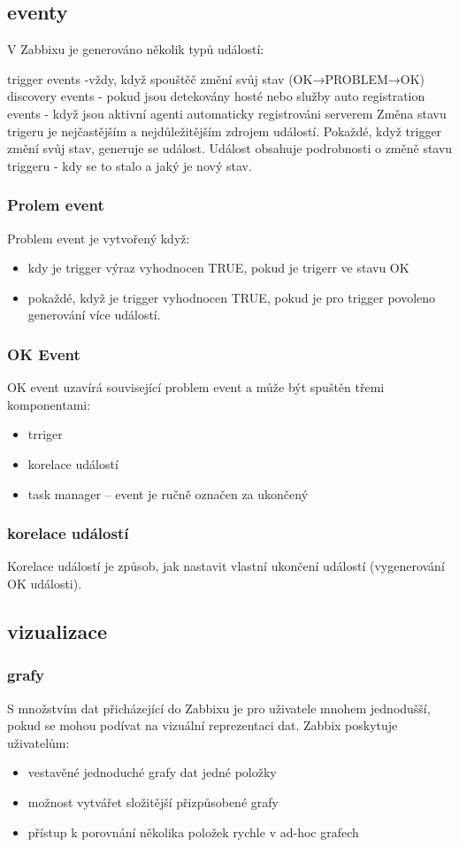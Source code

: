 \documentclass{article}
\begin{document}
 \subsection{eventy}
V Zabbixu je generováno několik typů událostí:

trigger events -vždy, když spouštěč změní svůj stav  (OK→PROBLEM→OK)
\newline discovery events -  pokud jsou detekovány hosté nebo služby
auto registration events -  když jsou aktivní agenti automaticky registrováni serverem
\newline
Změna stavu trigeru je nejčastějším a nejdůležitějším zdrojem událostí. Pokaždé, když trigger změní svůj stav, generuje se událost. Událost obsahuje podrobnosti o změně stavu triggeru - kdy se to stalo a jaký je nový stav. 
\subsubsection{Prolem event}
    Problem event je vytvořený když:
    \begin{itemize}
        \item kdy je trigger výraz vyhodnocen TRUE, pokud je trigerr ve stavu OK
        \item pokaždé, když je trigger vyhodnocen TRUE, pokud je pro trigger povoleno generování více událostí.
    \end{itemize}
\subsubsection{OK Event}
    OK event uzavírá související problem event a může být spuštěn třemi komponentami:
    \begin{itemize}
        \item trriger
        \item korelace událostí
        \item task manager – event je ručně označen za ukončený
    \end{itemize}
\subsubsection{korelace událostí}
Korelace událostí je způsob, jak nastavit vlastní ukončení událostí (vygenerování OK události).\newline
\subsection{vizualizace}
\subsubsection{grafy}
S množstvím dat přicházející do Zabbixu je pro uživatele mnohem jednodušší, pokud se mohou podívat na vizuální reprezentaci dat.
Zabbix poskytuje uživatelům:
\begin{itemize}
        \item vestavěné jednoduché grafy dat jedné položky
        \item možnost vytvářet složitější přizpůsobené grafy
        \item přístup k porovnání několika položek rychle v ad-hoc grafech
    \end{itemize}
\end{document}
